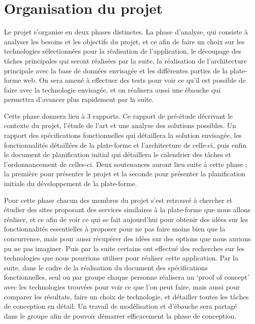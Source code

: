 \section{Organisation du projet}
\label{sec:organisation}
    Le projet s’organise en deux phases distinctes. La phase d’analyse, qui consiste à analyser les besoins
    et les objectifs du projet, et ce afin de faire un choix sur les technologies sélectionnées pour la
    réalisation de l’application, le découpage des tâches principales qui seront réalisées par la suite,
    la réalisation de l’architecture principale avec la base de données envisagée et les différentes parties
    de la plate-forme web. On sera amené à effectuer des tests pour voir ce qu’il est possible de faire avec
    la technologie envisagée, et on réalisera aussi une ébauche qui permettra d’avancer plus rapidement par la suite.

    Cette phase donnera lieu à 3 rapports. Ce rapport de pré-étude décrivant le contexte du projet, l’étude de l’art
    et une analyse des solutions possibles. Un rapport des spécifications fonctionnelles qui détaillera la solution
    envisagée, les fonctionnalités détaillées de la plate-forme et l’architecture de celle-ci, puis enfin le document
    de planification initial qui détaillera le calendrier des tâches et l’ordonnancement de celles-ci. Deux soutenances
    auront lieu suite à cette phase ; la première pour présenter le projet et la seconde pour présenter la planification
    initiale du développement de la plate-forme.

    Pour cette phase chacun des membres du projet s’est retrouvé à chercher et étudier des sites proposant des services
    similaires à la plate-forme que nous allons réaliser, et ce afin de voir ce qui se fait aujourd’hui pour obtenir des
    idées sur les fonctionnalités essentielles à proposer pour ne pas faire moins bien que la concurrence, mais pour aussi
    récupérer des idées sur des options que nous aurions pu ne pas imaginer. Puis par la suite certains ont effectué des
    recherches sur les technologies que nous pourrions utiliser pour réaliser cette application. Par la suite, dans le cadre
    de la réalisation du document des spécifications fonctionnelles, seul ou par groupe chaque personne réalisera un ‘proof
    of concept’ avec les technologies trouvées pour voir ce que l’on peut faire, mais aussi pour comparer les résultats,
    faire un choix de technologie, et détailler toutes les tâches de conception en détail. Un travail de modélisation et
    d’ébauche sera partagé dans le groupe afin de pouvoir démarrer efficacement la phase de conception.

